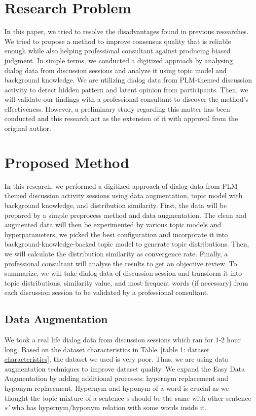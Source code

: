 \documentclass[conference]{IEEEtran}
\begin{document}
\section{Research Problem}
\label{sec_rp}
In this paper, we tried to resolve the disadvantages found in previous researches. We tried to propose a method to improve consensus quality that is reliable enough while also helping professional consultant against producing biased judgment. In simple terms, we conducted a digitized approach by analysing dialog data from discussion sessions and analyze it using topic model and background knowledge. We are utilizing dialog data from PLM-themed discussion activity to detect hidden pattern and latent opinion from participants. Then, we will validate our findings with a professional consultant to discover the method's effectiveness. However, a preliminary study regarding this matter has been conducted\cite{b3} and this research act as the extension of it with approval from the original author.

\section{Proposed Method}
In this research, we performed a digitized approach of dialog data from PLM-themed discussion activity sessions using data augmentation, topic model with background knowledge, and distribution similarity. First, the data will be prepared by a simple preprocess method and data augmentation. The clean and augmented data will then be experimented by various topic models and hyperparameters, we picked the best configuration and incorporate it into background-knowledge-backed topic model to generate topic distributions. Then, we will calculate the distribution similarity as convergence rate. Finally, a professional consultant will analyse the results to get an objective review. To summarize, we will take dialog data of discussion session and transform it into topic distributions, similarity value, and most frequent words (if necessary) from each discussion session to be validated by a professional consultant.

\subsection{Data Augmentation}
We took a real life dialog data from discussion sessions which ran for 1-2 hour long. Based on the dataset characteristics in Table~\ref{table 1: dataset characteristics}, the dataset we used is very poor. Thus, we are using data augmentation techniques to improve dataset quality. We expand the Easy Data Augmentation\cite{b7} by adding additional processes: hypernym replacement and hyponym replacement. Hypernym and hyponym of a word is crucial as we thought the topic mixture of a sentence {\it s} should be the same with other sentence {\it s'} who has hypernym/hyponym relation with some words inside it.
\end{document}
